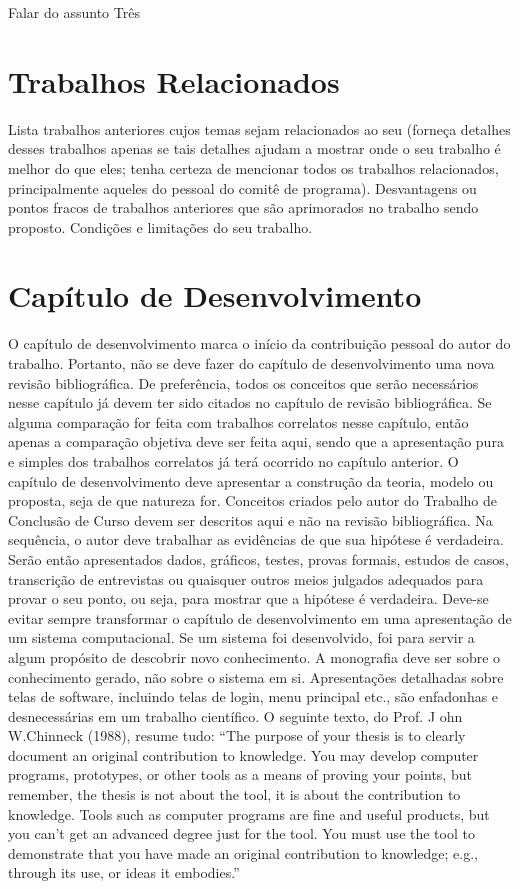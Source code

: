 \documentclass[
	12pt,				%
    oneside,			%
	a4paper,			%
	english,			%
	french,				%
	spanish,			%
	brazil,				%
	]{abntex2}
\begin{document}
Falar do assunto Três

\chapter{Trabalhos Relacionados}

Lista trabalhos anteriores cujos temas sejam relacionados ao seu (forneça detalhes desses trabalhos apenas se tais detalhes ajudam a mostrar onde o seu trabalho é melhor do que eles; tenha certeza de mencionar todos os trabalhos relacionados, principalmente aqueles do pessoal do comitê de programa). Desvantagens ou pontos fracos de trabalhos anteriores que são aprimorados no trabalho sendo proposto. Condições e limitações do seu trabalho.


\chapter{Capítulo de Desenvolvimento}

O capítulo de desenvolvimento marca o início da contribuição pessoal do autor do trabalho. Portanto, não se
deve fazer do capítulo de desenvolvimento uma nova revisão bibliográfica. De preferência, todos os conceitos
que serão necessários nesse capítulo já devem ter sido citados no capítulo de revisão bibliográfica. Se alguma
comparação for feita com trabalhos correlatos nesse capítulo, então apenas a comparação objetiva deve ser feita
aqui, sendo que a apresentação pura e simples dos trabalhos correlatos já terá ocorrido no capítulo anterior.
O capítulo de desenvolvimento deve apresentar a construção da teoria, modelo ou proposta, seja de que
natureza for. Conceitos criados pelo autor do Trabalho de Conclusão de Curso devem ser descritos aqui e não na revisão
bibliográfica. Na sequência, o autor deve trabalhar as evidências de que sua hipótese é verdadeira. Serão então
apresentados dados, gráficos, testes, provas formais, estudos de casos, transcrição de entrevistas ou quaisquer
outros meios julgados adequados para provar o seu ponto, ou seja, para mostrar que a hipótese é verdadeira.
Deve-se evitar sempre transformar o capítulo de desenvolvimento em uma apresentação de um sistema
computacional. Se um sistema foi desenvolvido, foi para servir a algum propósito de descobrir novo
conhecimento. A monografia deve ser sobre o conhecimento gerado, não sobre o sistema em si. Apresentações
detalhadas sobre telas de software, incluindo telas de login, menu principal etc., são enfadonhas e
desnecessárias em um trabalho científico. O seguinte texto, do Prof. J ohn W.Chinneck (1988), resume tudo:
“The purpose of your thesis is to clearly document an original contribution to knowledge. You may develop computer
programs, prototypes, or other tools as a means of proving your points, but remember, the thesis is not about the tool, it is
about the contribution to knowledge. Tools such as computer programs are fine and useful products, but you can’t get an
advanced degree just for the tool. You must use the tool to demonstrate that you have made an original contribution to
knowledge; e.g., through its use, or ideas it embodies.”
\end{document}
